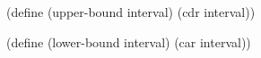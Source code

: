 \begtt\scm
(define (upper-bound interval)
  (cdr interval))

(define (lower-bound interval)
  (car interval))
\endtt
